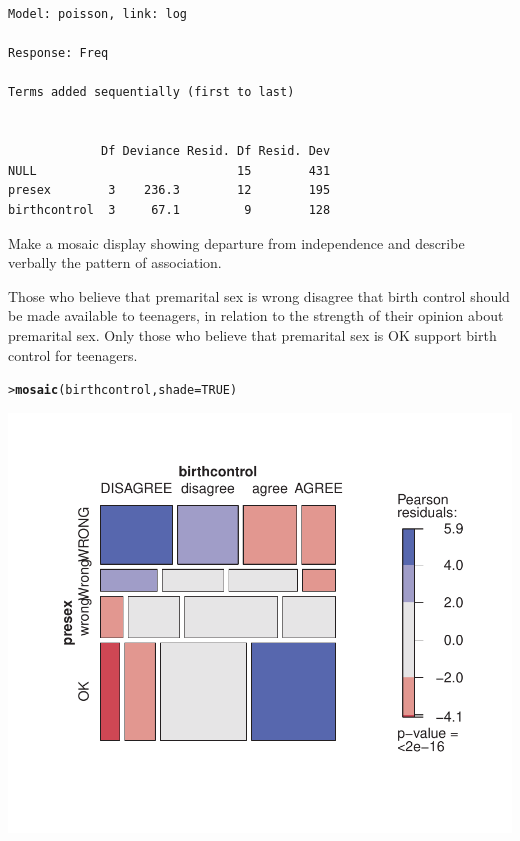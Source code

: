 \documentclass[10pt]{report}\usepackage[]{graphicx}\usepackage[]{color}
\makeatletter
\newcommand{\hlnum}[1]{\textcolor[rgb]{0.686,0.059,0.569}{#1}}%
\newcommand{\hlstd}[1]{\textcolor[rgb]{0.345,0.345,0.345}{#1}}%
\newcommand{\hlkwc}[1]{\textcolor[rgb]{0.333,0.667,0.333}{#1}}%
\newcommand{\hlkwd}[1]{\textcolor[rgb]{0.737,0.353,0.396}{\textbf{#1}}}%
\newenvironment{kframe}{%
 \def\at@end@of@kframe{}%
 \ifinner\ifhmode%
  \def\at@end@of@kframe{\end{minipage}}%
  \begin{minipage}{\columnwidth}%
 \fi\fi%
 \def\FrameCommand##1{\hskip\@totalleftmargin \hskip-\fboxsep
 \colorbox{shadecolor}{##1}\hskip-\fboxsep
     \hskip-\linewidth \hskip-\@totalleftmargin \hskip\columnwidth}%
 \MakeFramed {\advance\hsize-\width
   \@totalleftmargin\z@ \linewidth\hsize
   \@setminipage}}%
 {\par\unskip\endMakeFramed%
 \at@end@of@kframe}
\newenvironment{knitrout}{}{} %
\renewenvironment{knitrout}{\small\renewcommand{\baselinestretch}{.85}}{} %
\makeatother
\begin{document}
\begin{Exercises}
\begin{enumerate*}
\begin{ans}
\begin{knitrout}
\begin{kframe}
\begin{verbatim}
Model: poisson, link: log

Response: Freq

Terms added sequentially (first to last)


             Df Deviance Resid. Df Resid. Dev
NULL                            15        431
presex        3    236.3        12        195
birthcontrol  3     67.1         9        128
\end{verbatim}
\end{kframe}
\end{knitrout}
    \end{ans}
    
    \item Make a mosaic display showing departure from independence and describe
    verbally the pattern of association.
    \begin{ans}
    Those who believe that premarital sex is wrong disagree that birth control should be
    made available to teenagers, in relation to the strength of their opinion about
    premarital sex.  Only those who believe that premarital sex is OK support birth control
    for teenagers.
\begin{knitrout}\footnotesize
{}\color{fgcolor}\begin{kframe}
\begin{alltt}
\hlstd{> }\hlkwd{mosaic}\hlstd{(birthcontrol,} \hlkwc{shade}\hlstd{=}\hlnum{TRUE}\hlstd{)}
\end{alltt}
\end{kframe}

\centerline{\includegraphics[width=.5\textwidth]{soln/fig/ex10_2b-1} }



\end{knitrout}

    \end{ans}
    

\end{enumerate*}
\end{Exercises}
\end{document}
